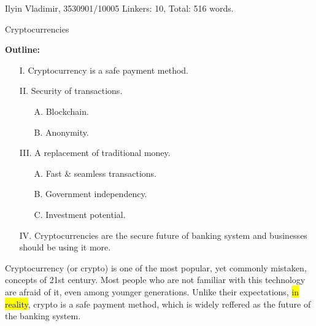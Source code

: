 \documentclass[a4paper,12pt]{article}
\newcommand{\linker}[1]{\colorbox{yellow}{#1}}
\begin{document}
    {\footnotesize Ilyin Vladimir, 3530901/10005}
    \hfill
    {\footnotesize Linkers: 10, Total: 516 words.}

    \begin{center}
        {\Large Cryptocurrencies}
    \end{center}
    
    \normalfont
    \textbf{Outline:}
    \begin{itemize}
        \item[I.] Cryptocurrency is a safe payment method.
        \item[II.] Security of transactions.
        \begin{itemize}
            \item[A.] Blockchain.
            \item[B.] Anonymity.
        \end{itemize}
        \item[III.] A replacement of traditional money.
        \begin{itemize}
            \item[A.] Fast \& seamless transactions.
            \item[B.] Government independency.
            \item[C.] Investment potential.
        \end{itemize}
        \item[IV.] Cryptocurrencies are the secure future of banking system and businesses should be using it more.
    \end{itemize}
    \vspace{1cm}
    \setlength{\parindent}{20pt}

    Cryptocurrency (or crypto) is one of the most popular, yet commonly mistaken, concepts of 21st century.
    Most people who are not familiar with this technology are afraid of it, even among younger generations.
    Unlike their expectations, \linker{in reality}, crypto is a safe payment method, which is widely reffered as the
    future of the banking system.
\end{document}
